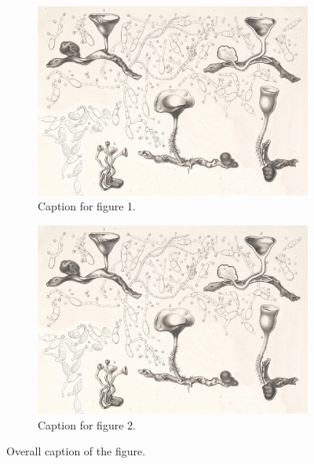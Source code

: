 \begin{figure}[!htpb]
    \centering
    \begin{subfigure}{0.45\textwidth}
        \centering
        \includegraphics[width=\textwidth]{Figures/PezizaTuberosa.jpg}
        \caption{Caption for figure 1.}
        \label{fig:figure-02.1}
    \end{subfigure}
    \hspace{.5cm} %
    \begin{subfigure}{0.45\textwidth}
        \centering
        \includegraphics[width=\textwidth]{Figures/PezizaTuberosa.jpg}
        \caption{Caption for figure 2.}
        \label{fig:figure-02.2}
    \end{subfigure}
    \caption{Overall caption of the figure.}
    \label{fig:figure-02}
\end{figure}

